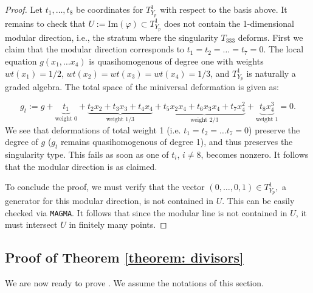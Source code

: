 \documentclass[12pt]{amsart}
\numberwithin{equation}{section}
\theoremstyle{plain}
\theoremstyle{remark}
\theoremstyle{definition}
\newcommand{\im}{\mathrm{Im}}
\begin{document}
\begin{proof}
Let $t_1,\dots,t_8$ be coordinates for $T^1_{Y_p}$ with respect to the basis above. It remains to check that $U:=\im(\varphi)\subset T^1_{Y_p}$ does not contain the 1-dimensional modular direction, i.e., the stratum where the singularity $T_{333}$ deforms. First we claim that the modular direction corresponds to $t_1=t_2=\dots =t_7=0.$
The local equation $g(x_1,\dots x_4)$ is quasihomogenous of degree one with weights $wt(x_1)=1/2$, $wt(x_2)=wt(x_3)=wt(x_4)=1/3$, and $T^1_{Y_p}$ is naturally a graded algebra. The total space of the miniversal deformation is given as:

$$g_t := g + \underbrace{t_1}_{\text{weight 0}} + \underbrace{t_2 x_2 + t_3 x_3 + t_4 x_4}_{\text{weight } 1/3} + \underbrace{t_5 x_2 x_4 + t_6 x_3 x_4 + t_7 x_4^2}_{\text{weight }2/3} + \underbrace{t_8 x_4^3}_{\text{weight 1}} = 0.$$ We see that deformations of total weight 1 (i.e. $t_1=t_2=\dots t_7=0$) preserve the degree of $g$ ($g_t$ remains quasihomogenous of degree 1), and thus preserves the singularity type. This fails as soon as one of $t_i$, $i\neq 8$, becomes nonzero. It follows that the modular direction is as claimed.

To conclude the proof, we must verify that the vector $(0,\dots ,0,1)\in T^1_{Y_p},$ a generator for this modular direction, is not contained in $U$. This can be easily checked via \verb|MAGMA|. It follows that since the modular line is not contained in $U$, it must intersect $U$ in finitely many points.
\end{proof}

\subsection{Proof of Theorem \ref{theorem: divisors}}\label{subsec: proof thm div}

We are now ready to prove . We assume the notations of this section.
\end{document}
